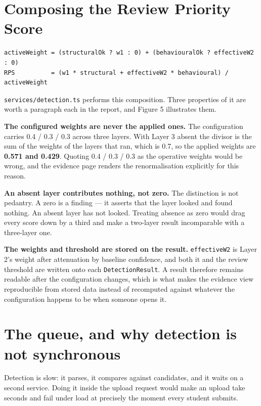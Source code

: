 \hypertarget{composing-the-review-priority-score}{%
\section{Composing the Review Priority
Score}\label{composing-the-review-priority-score}}

\begin{verbatim}
activeWeight = (structuralOk ? w1 : 0) + (behaviouralOk ? effectiveW2 : 0)
RPS          = (w1 * structural + effectiveW2 * behavioural) / activeWeight
\end{verbatim}

\texttt{services/detection.ts} performs this composition. Three
properties of it are worth a paragraph each in the report, and Figure 5
illustrates them.

\textbf{The configured weights are never the applied ones.} The
configuration carries 0.4 / 0.3 / 0.3 across three layers. With Layer 3
absent the divisor is the sum of the weights of the layers that ran,
which is 0.7, so the applied weights are \textbf{0.571 and 0.429}.
Quoting 0.4 / 0.3 / 0.3 as the operative weights would be wrong, and the
evidence page renders the renormalisation explicitly for this reason.

\textbf{An absent layer contributes nothing, not zero.} The distinction
is not pedantry. A zero is a finding --- it asserts that the layer
looked and found nothing. An absent layer has not looked. Treating
absence as zero would drag every score down by a third and make a
two-layer result incomparable with a three-layer one.

\textbf{The weights and threshold are stored on the result.}
\texttt{effectiveW2} is Layer 2's weight after attenuation by baseline
confidence, and both it and the review threshold are written onto each
\texttt{DetectionResult}. A result therefore remains readable after the
configuration changes, which is what makes the evidence view
reproducible from stored data instead of recomputed against whatever the
configuration happens to be when someone opens it.

\hypertarget{the-queue-and-why-detection-is-not-synchronous}{%
\section{The queue, and why detection is not
synchronous}\label{the-queue-and-why-detection-is-not-synchronous}}

Detection is slow: it parses, it compares against candidates, and it
waits on a second service. Doing it inside the upload request would make
an upload take seconds and fail under load at precisely the moment every
student submits.

